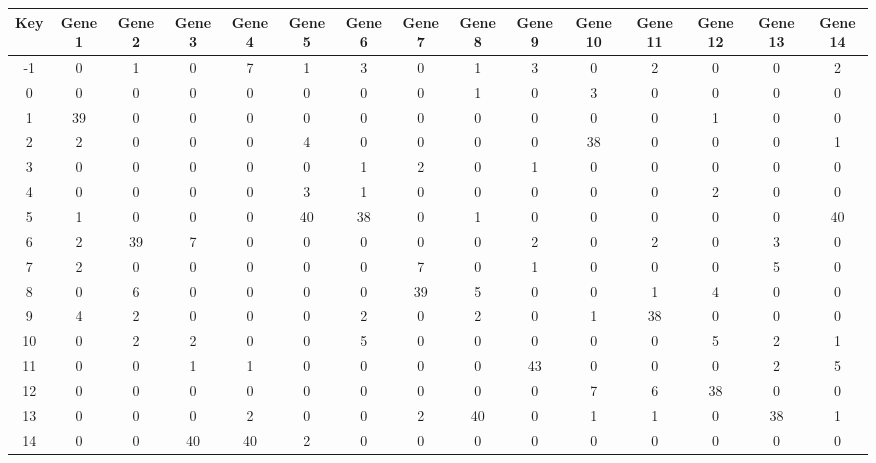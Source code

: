 \begin{tabular}{|c|c|c|c|c|c|c|c|c|c|c|c|c|c|c|}
\hline
Key & Gene 1 & Gene 2 & Gene 3 & Gene 4 & Gene 5 & Gene 6 & Gene 7 & Gene 8 & Gene 9 & Gene 10 & Gene 11 & Gene 12 & Gene 13 & Gene 14 \\
\hline
-1 & 0 & 1 & 0 & 7 & 1 & 3 & 0 & 1 & 3 & 0 & 2 & 0 & 0 & 2 \\
0 & 0 & 0 & 0 & 0 & 0 & 0 & 0 & 1 & 0 & 3 & 0 & 0 & 0 & 0 \\
1 & 39 & 0 & 0 & 0 & 0 & 0 & 0 & 0 & 0 & 0 & 0 & 1 & 0 & 0 \\
2 & 2 & 0 & 0 & 0 & 4 & 0 & 0 & 0 & 0 & 38 & 0 & 0 & 0 & 1 \\
3 & 0 & 0 & 0 & 0 & 0 & 1 & 2 & 0 & 1 & 0 & 0 & 0 & 0 & 0 \\
4 & 0 & 0 & 0 & 0 & 3 & 1 & 0 & 0 & 0 & 0 & 0 & 2 & 0 & 0 \\
5 & 1 & 0 & 0 & 0 & 40 & 38 & 0 & 1 & 0 & 0 & 0 & 0 & 0 & 40 \\
6 & 2 & 39 & 7 & 0 & 0 & 0 & 0 & 0 & 2 & 0 & 2 & 0 & 3 & 0 \\
7 & 2 & 0 & 0 & 0 & 0 & 0 & 7 & 0 & 1 & 0 & 0 & 0 & 5 & 0 \\
8 & 0 & 6 & 0 & 0 & 0 & 0 & 39 & 5 & 0 & 0 & 1 & 4 & 0 & 0 \\
9 & 4 & 2 & 0 & 0 & 0 & 2 & 0 & 2 & 0 & 1 & 38 & 0 & 0 & 0 \\
10 & 0 & 2 & 2 & 0 & 0 & 5 & 0 & 0 & 0 & 0 & 0 & 5 & 2 & 1 \\
11 & 0 & 0 & 1 & 1 & 0 & 0 & 0 & 0 & 43 & 0 & 0 & 0 & 2 & 5 \\
12 & 0 & 0 & 0 & 0 & 0 & 0 & 0 & 0 & 0 & 7 & 6 & 38 & 0 & 0 \\
13 & 0 & 0 & 0 & 2 & 0 & 0 & 2 & 40 & 0 & 1 & 1 & 0 & 38 & 1 \\
14 & 0 & 0 & 40 & 40 & 2 & 0 & 0 & 0 & 0 & 0 & 0 & 0 & 0 & 0 \\
\hline
\end{tabular}